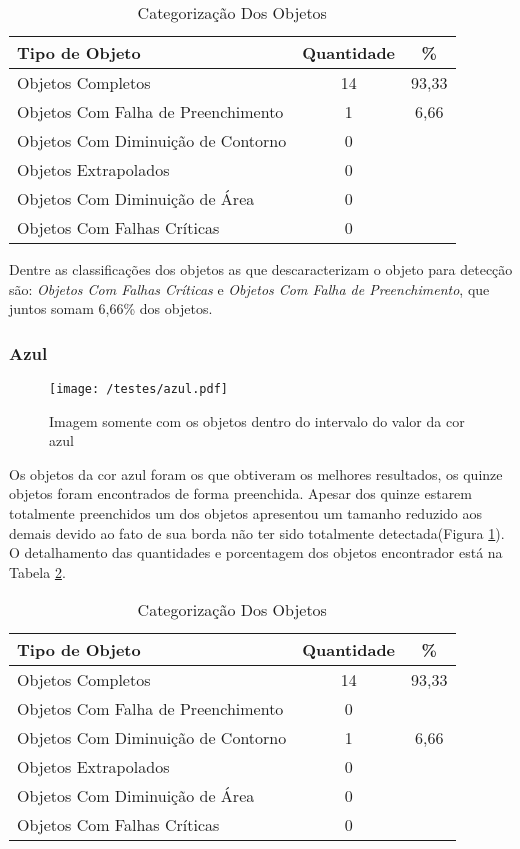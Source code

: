 	\begin{table}[H]
\centering
\begin{tabular}{l|c|c}
Tipo de Objeto & Quantidade & \%  \\%
\hline                               %
Objetos Completos & 14 & 93,33 \\
\hline 
Objetos Com Falha de Preenchimento & 1 & 6,66 \\
\hline 
Objetos Com Diminuição de Contorno & 0 &\\
\hline 
Objetos Extrapolados & 0 &\\
\hline 
Objetos Com Diminuição de Área &  0 &\\
\hline 
Objetos Com Falhas Críticas & 0 &\\
\hline 
\end{tabular}
\caption{Categorização Dos Objetos}
\label{tab:amarelo}
\end{table}

Dentre as classificações dos objetos as que descaracterizam o objeto para detecção são: \textit{Objetos Com Falhas Críticas} e \textit{Objetos Com Falha de Preenchimento}, que juntos somam 6,66\% dos objetos.

\subsubsection{Azul}
	\begin{figure}[H]
		\centering
		\texttt{[image: /testes/azul.pdf]}
		\caption{Imagem somente com os objetos dentro do intervalo do valor da cor azul}
		\label{fig:azul}
	\end{figure}

Os objetos da cor azul foram os que obtiveram os melhores resultados, os quinze objetos foram encontrados de forma preenchida. Apesar dos quinze estarem totalmente preenchidos um dos objetos apresentou um tamanho reduzido aos demais devido ao fato de sua borda não ter sido totalmente detectada(Figura \ref{fig:azul}).
O detalhamento das quantidades e porcentagem dos objetos encontrador está na Tabela \ref{tab:azul}.
\begin{table}[h]
\centering
\begin{tabular}{l|c|c}
Tipo de Objeto & Quantidade & \% \\ %
\hline                               %
Objetos Completos & 14 & 93,33 \\
\hline 
Objetos Com Falha de Preenchimento & 0\\
\hline 
Objetos Com Diminuição de Contorno &  1 & 6,66
\\
\hline 
Objetos Extrapolados &  0\\
\hline 
Objetos Com Diminuição de Área & 0 \\
\hline 
Objetos Com Falhas Críticas & 0 \\
\hline 
\end{tabular}
\caption{Categorização Dos Objetos}
\label{tab:azul}
\end{table}

